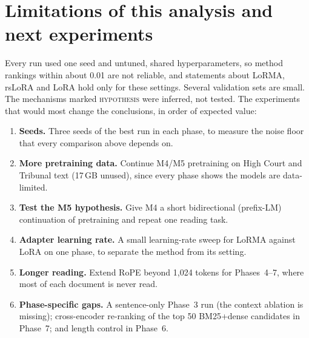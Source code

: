\documentclass[11pt, oneside]{article}
\newcommand{\hyp}{\textsc{hypothesis}}
\begin{document}
\section{Limitations of this analysis and next experiments}
Every run used one seed and untuned, shared hyperparameters, so method rankings within about 0.01 are not reliable,
and statements about LoRMA, rsLoRA and LoRA hold only for these settings. Several validation sets are small. The
mechanisms marked \hyp{} were inferred, not tested. The experiments that would most change the conclusions, in order
of expected value:
\begin{enumerate}[leftmargin=*, itemsep=1pt]
\item \textbf{Seeds.} Three seeds of the best run in each phase, to measure the noise floor that every comparison above
depends on.
\item \textbf{More pretraining data.} Continue M4/M5 pretraining on High Court and Tribunal text (17\,GB unused), since
every phase shows the models are data-limited.
\item \textbf{Test the M5 hypothesis.} Give M4 a short bidirectional (prefix-LM) continuation of pretraining and repeat
one reading task.
\item \textbf{Adapter learning rate.} A small learning-rate sweep for LoRMA against LoRA on one phase, to separate the
method from its setting.
\item \textbf{Longer reading.} Extend RoPE beyond 1{,}024 tokens for Phases~4--7, where most of each document is
never read.
\item \textbf{Phase-specific gaps.} A sentence-only Phase~3 run (the context ablation is missing); cross-encoder
re-ranking of the top 50 BM25+dense candidates in Phase~7; and length control in Phase~6.
\end{enumerate}
\end{document}

